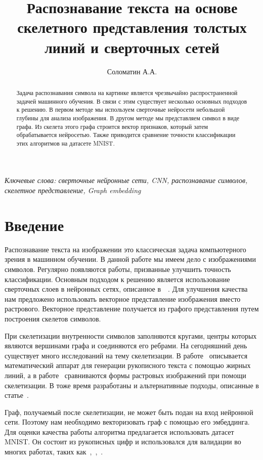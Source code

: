\documentclass{llncs}
\title{Распознавание текста на основе скелетного представления толстых линий и сверточных сетей }
\author{Соломатин А.А.}
\institute{Московский физико-технический институт (Государственный университет) \\ 
\email{solomatin.aa@phystech.edu}}
\begin{document}
\maketitle

\begin{abstract}
Задача распознавания символа на картинке является чрезвычайно распространенной задачей машинного обучения. В связи с этим существует несколько основных подходов к решению. В первом методе мы используем сверточные нейросети небольшой глубины для анализа изображения. В другом методе мы представляем символ в виде графа. Из скелета этого графа строится вектор признаков, который затем обрабатывается нейросетью. Также приводится сравнение точности классификации этих алгоритмов на датасете MNIST.
\end{abstract}

\textit{Ключевые слова: сверточные нейронные сети, CNN, распознавание символов, скелетное представление, Graph embedding}

\section{Введение}

Распознавание текста на изображении это классическая задача компьютерного зрения в машинном обучении. В данной работе мы имеем дело с изображениями символов. Регулярно появляются работы, призванные улучшить точность классификации. Основным подходом к решению является использование сверточных слоев в нейронных сетях, описанное в~\cite{cnn_1}~\cite{cnn_2}. Для улучшения качества нам предложено использовать векторное представление изображения вместо растрового. Векторное представление получается из графого представления путем построения скелетов символов. 

При скелетизации внутренности символов заполняются кругами, центры которых являются вершинами графа и соединяются его ребрами. На сегодняшний день существует много исследований на тему скелетизации. В работе~\cite{graphs_gen} описывается математический аппарат для генерации рукописного текста с помощью жирных линий, а в работе~\cite{graphs_shape_comp} сравниваются формы растровых изображений при помощи скелетизации. В тоже время разработаны и альтернативные подходы, описанные в статье~\cite{graphs_alt_method}. 

Граф, получаемый после скелетизации, не может быть подан на вход нейронной сети. Поэтому нам необходимо векторизовать граф с помощью его эмбеддинга. 
Для оценки качества работы алгоритма предлагается использовать датасет MNIST. Он состоит из рукописных цифр и использовался для валидации во многих работах, таких как~\cite{mnist_sample1},~\cite{mnist_sample2},~\cite{mnist_sample3}.
\end{document}
